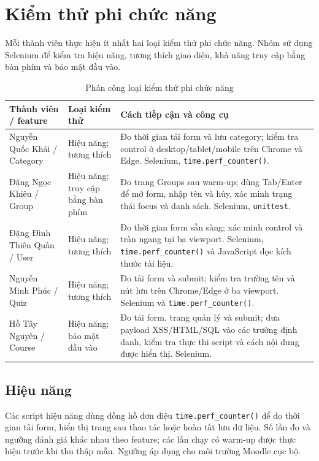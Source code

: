 \section{Kiểm thử phi chức năng}
\label{sec:nonfunctional}

Mỗi thành viên thực hiện ít nhất hai loại kiểm thử phi chức năng. Nhóm sử dụng Selenium để kiểm tra hiệu năng, tương thích giao diện, khả năng truy cập bằng bàn phím và bảo mật đầu vào.\cite{prj3brief,prj3source}

\begin{table}[H]
\centering
\caption{Phân công loại kiểm thử phi chức năng}
\label{tab:nfr-assignment}
\small
\begin{tabular}{|p{2.7cm}|p{3.2cm}|p{7.4cm}|}
\hline
\textbf{Thành viên / feature} & \textbf{Loại kiểm thử} & \textbf{Cách tiếp cận và công cụ} \\
\hline
Nguyễn Quốc Khải / Category & Hiệu năng; tương thích & Đo thời gian tải form và lưu category; kiểm tra control ở desktop/tablet/mobile trên Chrome và Edge. Selenium, \texttt{time.perf\_counter()}. \\
\hline
Đặng Ngọc Khiêu / Group & Hiệu năng; truy cập bằng bàn phím & Đo trang Groups sau warm-up; dùng Tab/Enter để mở form, nhập tên và hủy, xác minh trạng thái focus và danh sách. Selenium, \texttt{unittest}. \\
\hline
Đặng Đình Thiên Quân / User & Hiệu năng; tương thích & Đo thời gian form sẵn sàng; xác minh control và tràn ngang tại ba viewport. Selenium, \texttt{time.perf\_counter()} và JavaScript đọc kích thước tài liệu. \\
\hline
Nguyễn Minh Phúc / Quiz & Hiệu năng; tương thích & Đo tải form và submit; kiểm tra trường tên và nút lưu trên Chrome/Edge ở ba viewport. Selenium và \texttt{time.perf\_counter()}. \\
\hline
Hồ Tây Nguyên / Course & Hiệu năng; bảo mật đầu vào & Đo tải form, trang quản lý và submit; đưa payload XSS/HTML/SQL vào các trường định danh, kiểm tra thực thi script và cách nội dung được hiển thị. Selenium. \\
\hline
\end{tabular}
\end{table}

\subsection{Hiệu năng}
Các script hiệu năng dùng đồng hồ đơn điệu \texttt{time.perf\_counter()} để đo thời gian tải form, hiển thị trang sau thao tác hoặc hoàn tất lưu dữ liệu. Số lần đo và ngưỡng đánh giá khác nhau theo feature; các lần chạy có warm-up được thực hiện trước khi thu thập mẫu. Ngưỡng áp dụng cho môi trường Moodle cục bộ.

